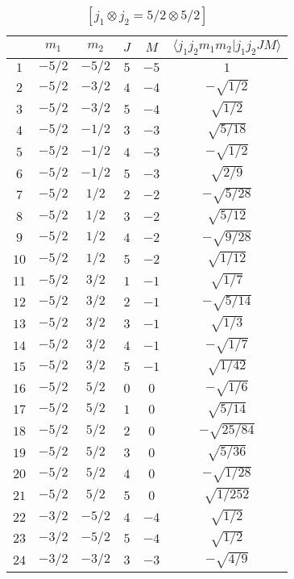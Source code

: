 \begin{table}
\tiny
\caption{$[j_1 \otimes j_2 = 5/2 \otimes 5/2]$}
\begin{center}
\begin{tabular}{|c|c|c|c|c|c|}
\hline 
   & $m_1$ & $m_2$ & $J$ & $M$ & $\langle j_1 j_2 m_1 m_2 | j_1 j_2 J M \rangle$ \\ 
\hline 
$1$ & $-5/2$ & $-5/2$ & $5$ & $-5$ & $1$ \\ 
$2$ & $-5/2$ & $-3/2$ & $4$ & $-4$ & $-\sqrt{1/2}$ \\ 
$3$ & $-5/2$ & $-3/2$ & $5$ & $-4$ & $\sqrt{1/2}$ \\ 
$4$ & $-5/2$ & $-1/2$ & $3$ & $-3$ & $\sqrt{5/18}$ \\ 
$5$ & $-5/2$ & $-1/2$ & $4$ & $-3$ & $-\sqrt{1/2}$ \\ 
$6$ & $-5/2$ & $-1/2$ & $5$ & $-3$ & $\sqrt{2/9}$ \\ 
$7$ & $-5/2$ & $1/2$ & $2$ & $-2$ & $-\sqrt{5/28}$ \\ 
$8$ & $-5/2$ & $1/2$ & $3$ & $-2$ & $\sqrt{5/12}$ \\ 
$9$ & $-5/2$ & $1/2$ & $4$ & $-2$ & $-\sqrt{9/28}$ \\ 
$10$ & $-5/2$ & $1/2$ & $5$ & $-2$ & $\sqrt{1/12}$ \\ 
$11$ & $-5/2$ & $3/2$ & $1$ & $-1$ & $\sqrt{1/7}$ \\ 
$12$ & $-5/2$ & $3/2$ & $2$ & $-1$ & $-\sqrt{5/14}$ \\ 
$13$ & $-5/2$ & $3/2$ & $3$ & $-1$ & $\sqrt{1/3}$ \\ 
$14$ & $-5/2$ & $3/2$ & $4$ & $-1$ & $-\sqrt{1/7}$ \\ 
$15$ & $-5/2$ & $3/2$ & $5$ & $-1$ & $\sqrt{1/42}$ \\ 
$16$ & $-5/2$ & $5/2$ & $0$ & $0$ & $-\sqrt{1/6}$ \\ 
$17$ & $-5/2$ & $5/2$ & $1$ & $0$ & $\sqrt{5/14}$ \\ 
$18$ & $-5/2$ & $5/2$ & $2$ & $0$ & $-\sqrt{25/84}$ \\ 
$19$ & $-5/2$ & $5/2$ & $3$ & $0$ & $\sqrt{5/36}$ \\ 
$20$ & $-5/2$ & $5/2$ & $4$ & $0$ & $-\sqrt{1/28}$ \\ 
$21$ & $-5/2$ & $5/2$ & $5$ & $0$ & $\sqrt{1/252}$ \\ 
$22$ & $-3/2$ & $-5/2$ & $4$ & $-4$ & $\sqrt{1/2}$ \\ 
$23$ & $-3/2$ & $-5/2$ & $5$ & $-4$ & $\sqrt{1/2}$ \\ 
$24$ & $-3/2$ & $-3/2$ & $3$ & $-3$ & $-\sqrt{4/9}$ \\ 

\end{tabular}
\end{center}
\end{table}
